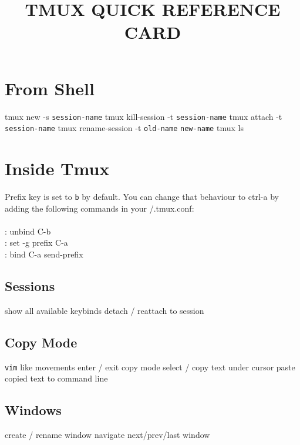 
\def\versionnumber{0.1}  %
\def\year{2014}
\def\month{May}
\def\version{v\versionnumber\ \month\ \year}



\title{TMUX QUICK REFERENCE CARD}

\shortintro

\section{From Shell}{}

	{tmux new -s {\tt session-name}}
	{tmux kill-session -t {\tt session-name}}
	{tmux attach -t {\tt session-name}}
	{tmux rename-session -t {\tt old-name} {\tt new-name}}
	{tmux ls}

\section{Inside Tmux}{Prefix key is set to {\tt \ctrl b} by default. You can
    change that behaviour to ctrl-a by adding the following
    commands in your \tild/.tmux.conf:\\\\
: unbind C-b\\
: set -g prefix C-a\\
: bind C-a send-prefix\\
}

\subsection{Sessions}{}
	{show all available keybinds}
	{detach / reattach to session}

\subsection{Copy Mode}{{\tt vim} like movements}
	{enter / exit copy mode}
	{select / copy text under cursor}
	{paste copied text to command line}

\subsection{Windows}{}
	{create / rename window}
	{navigate next/prev/last window}

